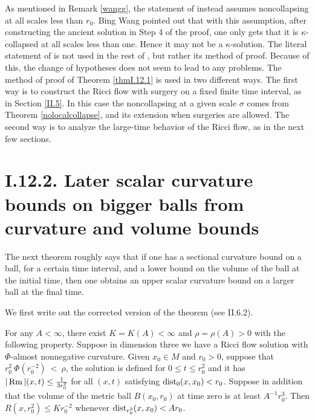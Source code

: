 \begin{remark}
  \label{rem:kl-canonical-neighborhood-theorem-structural-remark-canonical-neighborhoods}
 \label{wang}
As mentioned in Remark \ref{wangg}, the statement of
\cite[Theorem 12.1]{Perelman} instead assumes noncollapsing at all
scales less than $r_0$. Bing Wang pointed out that with this
assumption, after constructing the ancient solution in Step 4
of the proof, one only gets that it is $\kappa$-collapsed at
all scales less than one. Hence it may not be a $\kappa$-solution.
The literal statement of \cite[Theorem 12.1]{Perelman} is not
used in the rest of \cite{Perelman,Perelman2}, but rather its
method of proof.  Because of this, the change of hypotheses
does not seem to lead to any problems. The method of proof
of Theorem \ref{thmI.12.1} is used in two different ways.
The first way is to construct the Ricci flow with surgery on a
fixed finite time interval, as in Section \ref{II.5}.
In this case the
noncollapsing at a given scale $\sigma$ comes from
Theorem \ref{nolocalcollapse}, and its extension when surgeries
are allowed.  The second way is to analyze the large-time
behavior of the Ricci flow, as in the next few sections.
\end{remark}

\section{I.12.2. Later scalar curvature bounds on bigger balls
from curvature and volume bounds}
\label{I.12.2}

The next theorem roughly says that if one has a sectional curvature bound on a
ball, for a certain time interval, and
a lower bound on the volume of the ball at the initial time, then one obtains
an upper scalar curvature bound on a larger ball at the final time.

We first write out the corrected version of the theorem
(see II.6.2).
\begin{theorem}
  \label{thm:kl-later-scalar-curvature-bounds-bigger-balls-from-curvature-volume-bounds-positivity-scalar-curvature}
 \label{thmI.12.2}
For any $A < \infty$, there exist $K = K(A) < \infty$ and
$\rho = \rho(A) >  0$ with the following property. Suppose in
dimension three we have a Ricci flow solution with
$\Phi$-almost nonnegative curvature.
Given $x_0 \in M$ and $r_0 > 0$, suppose that
$r_0^2 \: \Phi(r_0^{-2}) \: < \: \rho$,
the solution is defined for
$0 \le t \le r_0^2$ and it has
$|\operatorname{Rm}|(x, t) \le \frac{1}{3r_0^{2}}$
for all $(x, t)$ satisfying $\operatorname{dist}_0(x, x_0) < r_0$. Suppose in
addition that the volume of the metric ball $B(x_0, r_0)$ at
time zero is at least $A^{-1} r_0^3$.
Then $R(x, r_0^2) \le K r_0^{-2}$ whenever $\operatorname{dist}_{r_0^2}(x, x_0) <
A r_0$.
\end{theorem}

